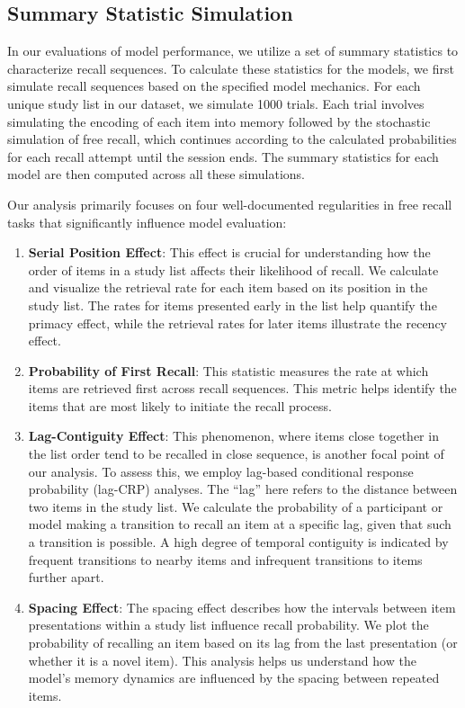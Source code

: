 \documentclass[
  letterpaper,
  11pt,
  english,
  singlespacing,
  headsepline]{MastersDoctoralThesis}
\providecommand{\tightlist}{%
  \setlength{\itemsep}{0pt}\setlength{\parskip}{0pt}}\usepackage{longtable,booktabs,array}
\begin{document}
\subsection{Summary Statistic
Simulation}\label{summary-statistic-simulation}

In our evaluations of model performance, we utilize a set of summary
statistics to characterize recall sequences. To calculate these
statistics for the models, we first simulate recall sequences based on
the specified model mechanics. For each unique study list in our
dataset, we simulate 1000 trials. Each trial involves simulating the
encoding of each item into memory followed by the stochastic simulation
of free recall, which continues according to the calculated
probabilities for each recall attempt until the session ends. The
summary statistics for each model are then computed across all these
simulations.

Our analysis primarily focuses on four well-documented regularities in
free recall tasks that significantly influence model evaluation:

\begin{enumerate}
\def\labelenumi{\arabic{enumi}.}
\tightlist
\item
  \textbf{Serial Position Effect}: This effect is crucial for
  understanding how the order of items in a study list affects their
  likelihood of recall. We calculate and visualize the retrieval rate
  for each item based on its position in the study list. The rates for
  items presented early in the list help quantify the primacy effect,
  while the retrieval rates for later items illustrate the recency
  effect.
\item
  \textbf{Probability of First Recall}: This statistic measures the rate
  at which items are retrieved first across recall sequences. This
  metric helps identify the items that are most likely to initiate the
  recall process.
\item
  \textbf{Lag-Contiguity Effect}: This phenomenon, where items close
  together in the list order tend to be recalled in close sequence, is
  another focal point of our analysis. To assess this, we employ
  lag-based conditional response probability (lag-CRP) analyses. The
  ``lag'' here refers to the distance between two items in the study
  list. We calculate the probability of a participant or model making a
  transition to recall an item at a specific lag, given that such a
  transition is possible. A high degree of temporal contiguity is
  indicated by frequent transitions to nearby items and infrequent
  transitions to items further apart.
\item
  \textbf{Spacing Effect}: The spacing effect describes how the
  intervals between item presentations within a study list influence
  recall probability. We plot the probability of recalling an item based
  on its lag from the last presentation (or whether it is a novel item).
  This analysis helps us understand how the model's memory dynamics are
  influenced by the spacing between repeated items.
\end{enumerate}
\end{document}
